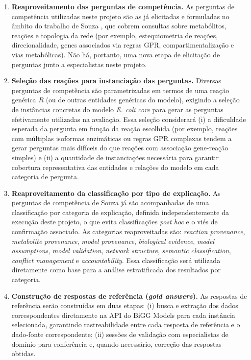 \documentclass{article}
\begin{document}
\begin{enumerate}
	\item \textbf{Reaproveitamento das perguntas de competência.} As perguntas de competência utilizadas neste projeto são as já elicitadas e formuladas no âmbito do trabalho de Souza \cite{souza2025ontogem}, que cobrem consultas sobre metabólitos, reações e topologia da rede (por exemplo, estequiometria de reações, direcionalidade, genes associados via regras GPR, compartimentalização e vias metabólicas). Não há, portanto, uma nova etapa de elicitação de perguntas junto a especialistas neste projeto.
	\item \textbf{Seleção das reações para instanciação das perguntas.} Diversas perguntas de competência são parametrizadas em termos de uma reação genérica $R$ (ou de outras entidades genéricas do modelo), exigindo a seleção de instâncias concretas do modelo \textit{E. coli core} para gerar as perguntas efetivamente utilizadas na avaliação. Essa seleção considerará (i) a dificuldade esperada da pergunta em função da reação escolhida (por exemplo, reações com múltiplas isoformas enzimáticas ou regras GPR complexas tendem a gerar perguntas mais difíceis do que reações com associação gene-reação simples) e (ii) a quantidade de instanciações necessária para garantir cobertura representativa das entidades e relações do modelo em cada categoria de pergunta.
	\item \textbf{Reaproveitamento da classificação por tipo de explicação.} As perguntas de competência de Souza \cite{souza2025ontogem} já são acompanhadas de uma classificação por categoria de explicação, definida independentemente da execução deste projeto, o que evita classificações \textit{post hoc} e o viés de confirmação associado. As categorias reaproveitadas são: \textit{reaction provenance}, \textit{metabolite provenance}, \textit{model provenance}, \textit{biological evidence}, \textit{model assumptions}, \textit{model validation}, \textit{network structure}, \textit{semantic classification}, \textit{conflict management} e \textit{accountability}. Essa classificação será utilizada diretamente como base para a análise estratificada dos resultados por categoria.
	\item \textbf{Construção de respostas de referência (\textit{gold answers}).} As respostas de referência serão construídas em duas etapas: (i) busca e extração dos dados correspondentes diretamente na API do BiGG Models para cada instância selecionada, garantindo rastreabilidade entre cada resposta de referência e o dado-fonte correspondente; (ii) sessões de validação com especialistas de domínio para conferência e, quando necessário, correção das respostas obtidas.

\end{enumerate}
\end{document}
